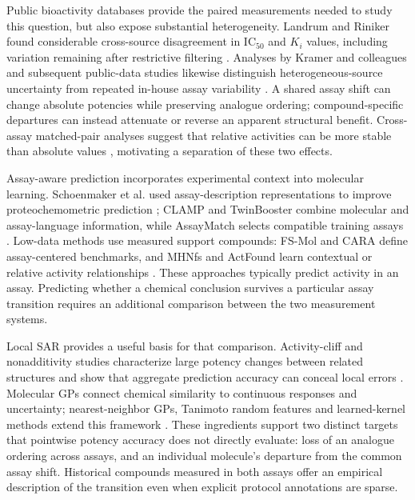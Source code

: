 \documentclass[letterpaper]{article}
\begin{document}
Public bioactivity databases provide the paired measurements needed to study this question, but also expose substantial heterogeneity. Landrum and Riniker found considerable cross-source disagreement in IC$_{50}$ and $K_i$ values, including variation remaining after restrictive filtering \citep{landrum2024noise}. Analyses by Kramer and colleagues and subsequent public-data studies likewise distinguish heterogeneous-source uncertainty from repeated in-house assay variability \citep{kramer2012uncertainty,kalliokoski2013mixed,kramer2016variability}. A shared assay shift can change absolute potencies while preserving analogue ordering; compound-specific departures can instead attenuate or reverse an apparent structural benefit. Cross-assay matched-pair analyses suggest that relative activities can be more stable than absolute values \citep{nelen2025matched}, motivating a separation of these two effects.

Assay-aware prediction incorporates experimental context into molecular learning. Schoenmaker et al. used assay-description representations to improve proteochemometric prediction \citep{schoenmaker2025context}; CLAMP and TwinBooster combine molecular and assay-language information, while AssayMatch selects compatible training assays \citep{seidl2023clamp,schuh2024twinbooster,fan2026assaymatch}. Low-data methods use measured support compounds: FS-Mol and CARA define assay-centered benchmarks, and MHNfs and ActFound learn contextual or relative activity relationships \citep{stanley2021fsmol,tian2024cara,schimunek2023mhnfs,feng2024actfound}. These approaches typically predict activity in an assay. Predicting whether a chemical conclusion survives a particular assay transition requires an additional comparison between the two measurement systems.

Local SAR provides a useful basis for that comparison. Activity-cliff and nonadditivity studies characterize large potency changes between related structures and show that aggregate prediction accuracy can conceal local errors \citep{hu2012mmpcliffs,stumpfe2014cliffs,dimova2016cliffs,stumpfe2019concept,nonadditivity2021,tilborg2022cliffs}. Molecular GPs connect chemical similarity to continuous responses and uncertainty; nearest-neighbor GPs, Tanimoto random features and learned-kernel methods extend this framework \citep{difranzo2020nngp,tripp2023tanimoto,wilson2016dkl,patacchiola2020dkt,chen2023adkf}. These ingredients support two distinct targets that pointwise potency accuracy does not directly evaluate: loss of an analogue ordering across assays, and an individual molecule's departure from the common assay shift. Historical compounds measured in both assays offer an empirical description of the transition even when explicit protocol annotations are sparse.
\end{document}
